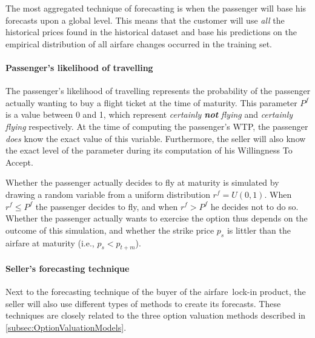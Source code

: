 The most aggregated technique of forecasting is when the passenger will base his forecasts upon a global level. This means that the customer will use \emph{all} the historical prices found in the historical dataset and base his predictions on the empirical distribution of all airfare changes occurred in the training set.


\paragraph{Passenger's likelihood of travelling}
The passenger's likelihood of travelling represents the probability of the passenger actually wanting to buy a flight ticket at the time of maturity. This parameter $P^f$ is a value between 0 and 1, which represent \emph{certainly \textbf{not} flying} and \emph{certainly flying} respectively. At the time of computing the passenger's WTP, the passenger \emph{does} know the exact value of this variable. Furthermore, the seller will also know the exact level of the parameter during its computation of his Willingness To Accept.

Whether the passenger actually decides to fly at maturity is simulated by drawing a random variable from a uniform distribution $r^f = U(0,1)$. When $r^f \le P^f$ the passenger decides to fly, and when $r^f > P^f$ he decides not to do so. Whether the passenger actually wants to exercise the option thus depends on the outcome of this simulation, and whether the strike price $p_s$ is littler than the airfare at maturity (i.e., $p_s < p_{t+m}$).

\paragraph{Seller's forecasting technique}
Next to the forecasting technique of the buyer of the airfare~lock-in product, the seller will also use different types of methods to create its forecasts. These techniques are closely related to the three option valuation methods described in \autoref{subsec:OptionValuationModels}.

